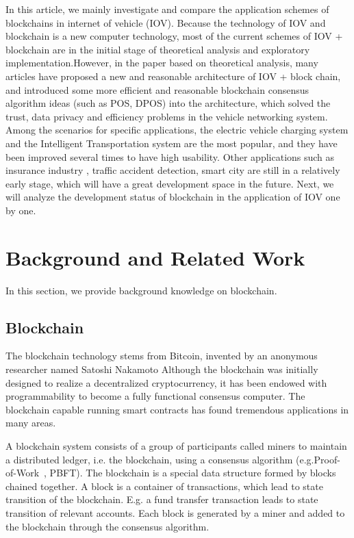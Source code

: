 In this article, we mainly investigate and compare the application schemes of blockchains in internet of vehicle (IOV). Because the technology of IOV and blockchain is a new computer technology, most of the current schemes of IOV + blockchain are in the initial stage of theoretical analysis and exploratory implementation.However, in the paper based on theoretical analysis, many articles have proposed a new and reasonable architecture of IOV + block chain, and introduced some more efficient and reasonable blockchain consensus algorithm ideas (such as POS, DPOS) into the architecture, which solved the trust, data privacy and efficiency problems in the vehicle networking system. Among the scenarios for specific applications, the electric vehicle charging system\cite{ref49} \cite{ref51} \cite{ref61} \cite{ref64} and the Intelligent Transportation system are the most popular, and they have been improved several times to have high usability. Other applications such as insurance industry \cite{ref40}, traffic accident detection, smart city \cite{ref52} \cite{ref70} are still in a relatively early stage, which will have a great development space in the future. Next, we will analyze the development status of blockchain in the application of IOV one by one.


\section{Background and Related Work}\label{sec:background}
In this section, we provide background knowledge on blockchain.


\subsection{Blockchain}
The blockchain technology stems from Bitcoin, invented by an anonymous researcher named Satoshi Nakamoto Although the blockchain was initially designed to realize a decentralized cryptocurrency, it has been endowed with programmability to become a fully functional consensus computer. The blockchain capable running smart contracts has found tremendous applications in many areas.

A blockchain system consists of a group of participants called miners to maintain a distributed ledger, i.e. the blockchain, using a consensus algorithm (e.g.Proof-of-Work~, PBFT). The blockchain is a special data structure formed by blocks chained together. A block is a container of transactions, which lead to state transition of the blockchain. E.g. a fund transfer transaction leads to state transition of relevant accounts. Each block is generated by a miner and added to the blockchain through the consensus algorithm.

